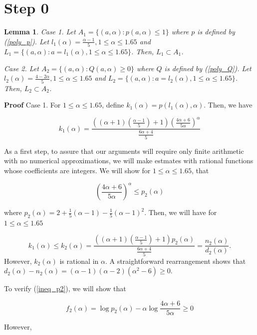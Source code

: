 \documentclass[12pt]{article}
\newcommand{\ds}{\displaystyle}
\newtheorem{lemma}[theorem]{Lemma}
\begin{document}
\section{Step 0}

\begin{lemma}
Case 1. Let $A_1 = \{(a,\alpha) : p(a,\alpha) \le 1\}$ where $p$ is defined by (\ref{poly_p}).  
Let ${\ds l_1(\alpha) = \frac{\alpha-1}{5}, 1 \le \alpha \le 1.65}$ and 
$L_1 = \{(a,\alpha) : a = l_1(\alpha), 1 \le \alpha \le 1.65\}$.  Then, $L_1 \subset  A_1$. 

Case 2. Let $A_2 = \{(a,\alpha) : Q(a,\alpha) \ge 0\}$ where $Q$ is defined by (\ref{poly_Q}).  
Let ${\ds l_2(\alpha) = \frac{4-2\alpha}{5}, 1 \le \alpha \le 1.65}$ and 
$L_2 = \{(a,\alpha) : a = l_2(\alpha), 1 \le \alpha \le 1.65\}$.  Then, $L_2 \subset A_2$.
\end{lemma}

\textbf{Proof} Case 1. For $1 \le \alpha \le 1.65$, define $k_1(\alpha) = p(l_1(\alpha),\alpha)$.  
Then, we have

$$
{\ds k_1(\alpha) = \frac{((\alpha+1)(\frac{\alpha-1}{5})+1)\left ( \frac{4\alpha+6}{5\alpha}\right)^{\alpha}}{\frac{6\alpha+4}{5}} }
$$

\noindent As a first step, to assure that our arguments will require only finite arithmetic with no numerical approximations, we will make estmates with rational functions whose coefficients are integers.  We will show for $1 \le \alpha \le 1.65$, that 

\begin{equation} \label {ineq_p2}
\left (\frac{4\alpha+6}{5\alpha} \right )^{\alpha} \le p_2(\alpha)
\end{equation}

\noindent where 
${\ds p_2(\alpha) = 2 + \frac{1}{5}(\alpha-1) - \frac{1}{5}(\alpha-1)^2}$.  Then, we will have for $1 \le \alpha \le 1.65$ 

$$
k_1(\alpha) \le k_2(\alpha) = \frac{((\alpha+1)(\frac{\alpha-1}{5})+1)p_2(\alpha) }{\frac{6\alpha+4}{5}} = \frac{n_2(\alpha)}{d_2(\alpha)}.
$$
However, $k_2(\alpha)$ is rational in $\alpha$. A straightforward rearrangement shows that 
$d_2(\alpha) - n_2(\alpha) = (\alpha-1)(\alpha-2)(\alpha^2-6) \ge 0$.  

To verify (\ref{ineq_p2}), we will show 
that 

$$ 
f_2(\alpha) = \log p_2(\alpha) - \alpha \log \frac{4\alpha+6}{5\alpha}  \ge 0
$$

\noindent However, 
\end{document}
